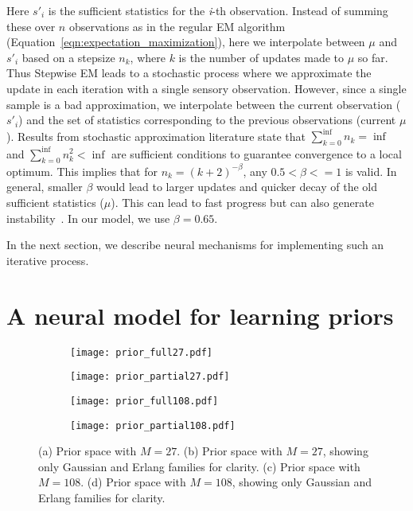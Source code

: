 \documentclass[10pt,letterpaper]{article}
\begin{document}
Here $s'_{i}$ is the sufficient statistics for the \textit{i}-th observation. Instead of summing these over $n$ observations as in the regular EM algorithm (Equation~\ref{eqn:expectation_maximization}), here we interpolate between $\mu$ and $s'_{i}$ based on a stepsize $n_{k}$, where $k$ is the number of updates made to $\mu$ so far. Thus Stepwise EM leads to a stochastic process where we approximate the update in each iteration with a single sensory observation. However, since a single sample is a bad approximation, we interpolate between the current observation ($s'_{i}$) and the set of statistics corresponding to the previous observations (current $\mu$). Results from stochastic approximation literature state that $\sum_{k=0}^{\inf} n_{k} = \inf$ and $\sum_{k=0}^{\inf} n_{k}^2 < \inf$ are sufficient conditions to guarantee convergence to a local optimum. This implies that for $n_{k} = (k+2)^{-\beta}$, any $0.5 < \beta <= 1$ is valid. In general, smaller $\beta$ would lead to larger updates and quicker decay of the old sufficient statistics ($\mu$). This can lead to fast progress but can also generate instability~\cite{liang2009online}. In our model, we use $\beta = 0.65$.

In the next section, we describe neural mechanisms for implementing such an iterative process.

\section{A neural model for learning priors}

\begin{figure*}[h]
\setlength{\abovecaptionskip}{-10pt}
    \centering
    \begin{subfigure}{.24\textwidth}
        \texttt{[image: prior\_full27.pdf]}
        \label{fig:prior_full27}
    \end{subfigure}
    \begin{subfigure}{.24\textwidth}
        \texttt{[image: prior\_partial27.pdf]} 
        \label{fig:prior_partial27}
    \end{subfigure}
    \begin{subfigure}{.24\textwidth}
        \texttt{[image: prior\_full108.pdf]}
        \label{fig:prior_full108}
    \end{subfigure}
    \begin{subfigure}{.24\textwidth}
        \texttt{[image: prior\_partial108.pdf]} 
        \label{fig:prior_partial108}
    \end{subfigure}
    \caption{(a) Prior space with $M = 27$. (b) Prior space with $M = 27$, showing only Gaussian and Erlang families for clarity. (c) Prior space with $M = 108$. (d) Prior space with $M = 108$, showing only Gaussian and Erlang families for clarity.
    }\label{fig:prior_space}
\end{figure*}
\end{document}
